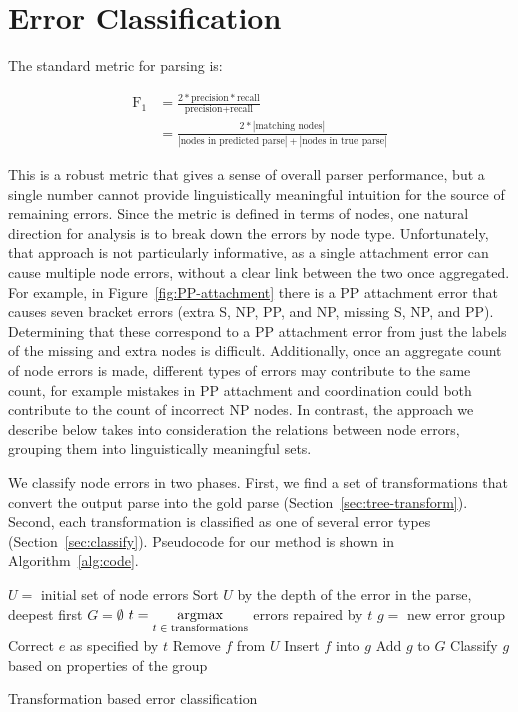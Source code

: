 \section{Error Classification} \label{sec:errors-intro}

The standard metric for parsing is:

\begin{align*}
  \text{F}_1 & = \frac{2 * \text{precision} * \text{recall}}{\text{precision} + \text{recall}} \\
            & = \frac{2 * |\text{matching nodes}|}{|\text{nodes in predicted parse}| + |\text{nodes in true parse}|}
\end{align*}

This is a robust metric that gives a sense of overall parser performance, but a single number cannot provide linguistically meaningful intuition for the source of remaining errors.
Since the metric is defined in terms of nodes, one natural direction for analysis is to break down the errors by node type.
Unfortunately, that approach is not particularly informative, as a single attachment error can cause multiple node errors, without a clear link between the two once aggregated.
For example, in Figure~\ref{fig:PP-attachment} there is a PP attachment error that causes seven bracket errors (extra S, NP, PP, and NP, missing S, NP, and PP).
Determining that these correspond to a PP attachment error from just the labels of the missing and extra nodes is difficult.
Additionally, once an aggregate count of node errors is made, different types of errors may contribute to the same count, for example mistakes in PP attachment and coordination could both contribute to the count of incorrect NP nodes.
In contrast, the approach we describe below takes into consideration the relations between node errors, grouping them into linguistically meaningful sets.

We classify node errors in two phases.
First, we find a set of transformations that convert the output parse into the gold parse (Section~\ref{sec:tree-transform}).
Second, each transformation is classified as one of several error types (Section~\ref{sec:classify}).
Pseudocode for our method is shown in Algorithm~\ref{alg:code}.

\begin{algorithm}[t]
\begin{algorithmic}
\State $U =$ initial set of node errors
\State Sort $U$ by the depth of the error in the parse, deepest first
\State
\State $G = \emptyset$ 
  \State $t = \underset{t \;\in\; \mathrm{transformations\tiny\strut}}{\operatorname*{argmax}}$ errors repaired by $t$
  \State $g =$ new error group
  \State Correct $e$ as specified by $t$
    \State Remove $f$ from $U$
    \State Insert $f$ into $g$
  \EndFor
  \State Add $g$ to $G$
\EndFor
\State
{} 
	\State Classify $g$ based on properties of the group
\EndFor
\end{algorithmic}
\caption{ \label{alg:code}
	Transformation based error classification
}
\end{algorithm}

